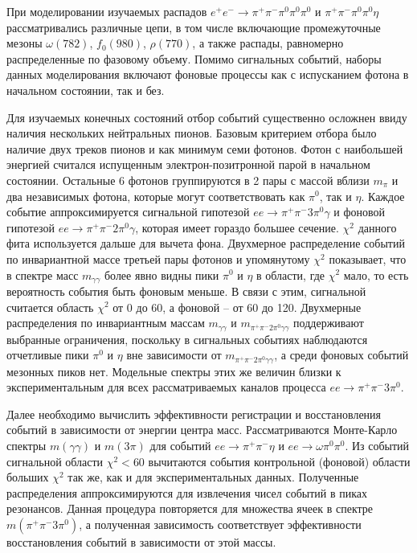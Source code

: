\documentclass[a4paper, 12pt]{article}
\def\pip{\pi^+}
\def\pim{\pi^-}
\def\piz{\pi^0}
\begin{document}
При моделировании изучаемых распадов $e^+e^- \rightarrow 
\pi^+\pi^-\pi^0\pi^0\pi^0$ и $\pi^+\pi^-\pi^0\pi^0\eta$ рассматривались 
различные цепи, в том числе включающие промежуточные мезоны 
$\omega(782)$, $f_0(980)$, $\rho(770)$, а также распады, равномерно 
распределенные по фазовому объему. Помимо сигнальных событий, наборы 
данных моделирования включают фоновые процессы как с испусканием фотона 
в начальном состоянии, так и без.

Для изучаемых конечных состояний отбор событий существенно осложнен 
ввиду наличия нескольких нейтральных пионов. Базовым критерием отбора 
было наличие двух треков пионов и как минимум семи фотонов. Фотон 
с наибольшей энергией считался испущенным электрон-позитронной парой 
в начальном состоянии. Остальные 6 фотонов группируются в 2 пары 
с массой вблизи $m_\pi$ и два независимых фотона, которые могут 
соответствовать как $\pi^0$, так и $\eta$. Каждое событие 
аппроксимируется сигнальной гипотезой $ee\to\pip\pim3\piz\gamma$ 
и фоновой гипотезой $ee\to\pip\pim2\piz\gamma$, которая имеет гораздо 
большее сечение. $\chi^2$ данного фита используется дальше для вычета 
фона.
%
Двухмерное распределение событий по инвариантной массе третьей пары 
фотонов и упомянутому $\chi^2$ показывает, что в спектре масс 
$m_{\gamma\gamma}$ более явно видны пики $\pi^0$ и $\eta$ в области, где 
$\chi^2$ мало, то есть вероятность события быть фоновым меньше. В связи 
с этим, сигнальной считается область $\chi^2$ от 0 до 60, а фоновой -- 
от 60 до 120. Двухмерные распределения по инвариантным массам 
$m_{\gamma\gamma}$ и $m_{\pip\pim2\piz\gamma\gamma}$ поддерживают 
выбранные ограничения, поскольку в сигнальных событиях наблюдаются 
отчетливые пики $\piz$ и $\eta$ вне зависимости от 
$m_{\pip\pim2\piz\gamma\gamma}$, а среди фоновых событий мезонных пиков 
нет.
%
Модельные спектры этих же величин близки к экспериментальным для всех 
рассматриваемых каналов процесса $ee\to\pip\pim3\piz$.

Далее необходимо вычислить эффективности регистрации и восстановления 
событий в зависимости от энергии центра масс. Рассматриваются 
Монте-Карло спектры $m(\gamma\gamma)$ и $m(3\pi)$ для событий 
$ee\to\pip\pim\eta$ и $ee\to\omega\piz\piz$. Из событий сигнальной 
области $\chi^2<60$ вычитаются события контрольной (фоновой) области 
больших $\chi^2$ так же, как и для экспериментальных данных. Полученные 
распределения аппроксимируются для извлечения чисел событий в пиках 
резонансов. Данная процедура повторяется для множества ячеек в спектре 
$m(\pip\pim3\piz)$, а полученная зависимость соответствует эффективности 
восстановления событий в зависимости от этой массы.
\end{document}
